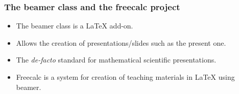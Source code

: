 \begin{frame}
\frametitle{The beamer class and the freecalc project}
\begin{itemize}
\item The beamer class is a \LaTeX{} add-on.
\item Allows the creation of presentations/slides such as the present one.
\item The \emph{de-facto} standard for mathematical scientific presentations.
\item Freecalc is a system for creation of teaching materials in \LaTeX{} using beamer. 
\end{itemize}
\end{frame}